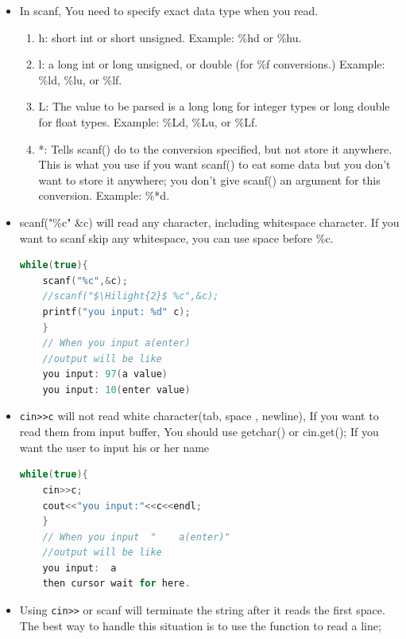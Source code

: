 \documentclass[a4paper,11pt,twoside]{book}
\newcommand{\Hilight}[1]{\makebox[0pt][l]{\color{yellow}\rule[-3pt]{#1em}{11pt}}}
\newcommand{\Hilight}[1]{}
\begin{document}
\begin{itemize}
	
	\item In scanf, You need to specify exact data type when you read.
	\begin{enumerate}
		\item h:  short int or short unsigned. Example: \%hd or \%hu.
		
		\item l:  a long int or long unsigned, or double (for \%f conversions.) Example: \%ld, \%lu, or \%lf.
		
		\item L: The value to be parsed is a long long for integer types or long double for float types. Example: \%Ld, \%Lu, or \%Lf.
		
		\item *: Tells scanf() do to the conversion specified, but not store it anywhere. This is what you use if you want scanf() to eat some data but you don't want to store it anywhere; you don't give scanf() an argument for this conversion. Example: \%*d.
	\end{enumerate}
	
	
	\item scanf("\%c" \&c) will read any character, including whitespace character. If you want to scanf skip any whitespace, you can use space before \%c.
	
	\begin{lstlisting}[frame=single, language=c++, mathescape=true]
	while(true){
	scanf("%c",&c);
	//scanf("$\Hilight{2}$ %c",&c);
	printf("you input: %d" c);
	}
	// When you input a(enter)
	//output will be like
	you input: 97(a value)
	you input: 10(enter value)
	\end{lstlisting}
	
	
	\item \verb=cin>>c= will not read white character(tab, space , newline), If you want to read them from input buffer, You should use getchar() or cin.get(); If you want the user to input his or her name
	\begin{lstlisting}[frame=single, language=c++, mathescape=true]
	while(true){
	cin>>c;
	cout<<"you input:"<<c<<endl;
	}
	// When you input  "    a(enter)"
	//output will be like
	you input:  a
	then cursor wait for here.
	\end{lstlisting}
	
	\item Using \verb=cin>>= or scanf will terminate the string after it reads the first space. The best way to handle this situation is to use the function to read a line;
	

\end{itemize}
\end{document}

